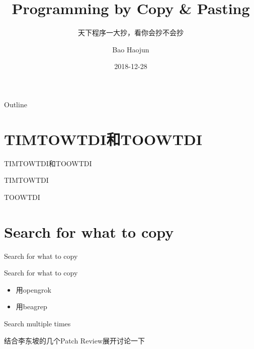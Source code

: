 \documentclass[presentation,dvipdfmx,CJKbookmarks]{beamer}
\author{Bao Haojun}
\date{2018-12-28}
\title{Programming by Copy \& Pasting}
\subtitle{天下程序一大抄，看你会抄不会抄}
\begin{document}
\begin{CJK*}{UTF8}{simsun}

\maketitle
\begin{frame}{Outline}
\tableofcontents
\end{frame}

\CJKtilde

\section{TIMTOWTDI\thinspace 和\thinspace TOOWTDI}
\label{sec:org43271e4}

\begin{frame}[label={sec:orgd441def}]{TIMTOWTDI\thinspace 和\thinspace TOOWTDI}
\begin{block}{TIMTOWTDI}
\pause
\end{block}
\begin{block}{TOOWTDI}
\pause
\end{block}
\end{frame}

\section{Search for what to copy}
\label{sec:org5ec2165}

\begin{frame}[label={sec:org1637410}]{Search for what to copy}
\begin{block}{Search for what to copy}
\begin{itemize}
\item 用\thinspace opengrok
\item 用\thinspace beagrep
\end{itemize}

\pause
\end{block}
\begin{block}{Search multiple times}
\end{block}
\end{frame}
\begin{frame}[label={sec:org3c33a44}]{结合李东坡的几个\thinspace Patch Review\thinspace 展开讨论一下}
\end{frame}
\end{CJK*}
\end{document}

